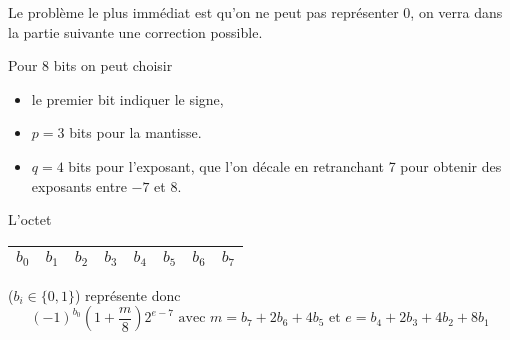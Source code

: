 Le problème le plus immédiat est qu'on ne peut pas représenter 0,  on verra dans la partie suivante une correction possible.

\newpage

Pour 8 bits on peut choisir

\begin{itemize}
   \item le premier bit indiquer le signe,
   \item $p=3$ bits pour la mantisse.
   \item $q=4$ bits pour l'exposant, que l'on décale en retranchant 7 pour obtenir des exposants entre $-7$ et 8.
 \end{itemize}



L'octet \begin{tabular}{|l|l|l|l|l|l|l|l|}
$b_0$&$b_1$&$b_2$&$b_3$&$b_4$&$b_5$&$b_6$&$b_7$\\ 
\hline \end{tabular}
($b_i\in\{0,1\}$) représente donc 
\[(-1)^{b_0}\left(1 + \frac m{8}\right)2^{e-7}\text{ avec }m = b_7+2b_6+4b_5\text{ et } e=b_4+2b_3+4b_2+8b_1\]

